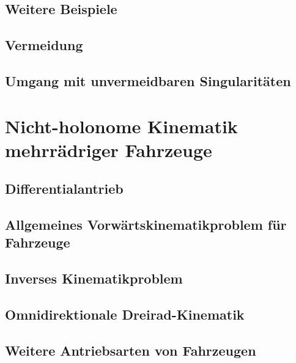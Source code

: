 \documentclass[a4paper, 11pt, accentcolor = tud3b]{tudreport}
\begin{document}
			\subsection{Weitere Beispiele} %

			\subsection{Vermeidung} %

			\subsection{Umgang mit unvermeidbaren Singularitäten} %

		\section{Nicht-holonome Kinematik mehrrädriger Fahrzeuge} %

			\subsection{Differentialantrieb} %

			\subsection{Allgemeines Vorwärtskinematikproblem für Fahrzeuge} %

			\subsection{Inverses Kinematikproblem} %

			\subsection{Omnidirektionale Dreirad-Kinematik} %

			\subsection{Weitere Antriebsarten von Fahrzeugen} %
\end{document}
